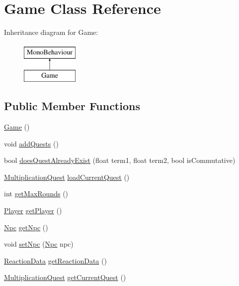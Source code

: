 \hypertarget{classGame}{}\section{Game Class Reference}
\label{classGame}
Inheritance diagram for Game\+:\begin{figure}[H]
\begin{center}
\leavevmode
\includegraphics[height=2.000000cm]{classGame}
\end{center}
\end{figure}
\subsection*{Public Member Functions}
\begin{DoxyCompactItemize}
\item 
\hyperlink{classGame_a2e034e53e9c032964ecd2a831b29a616}{Game} ()
\item 
void \hyperlink{classGame_ab082e0ceed285697693c3750e203d597}{add\+Quests} ()
\item 
bool \hyperlink{classGame_a0040f1dc86b0628a17286895b1738a10}{does\+Quest\+Already\+Exist} (float term1, float term2, bool is\+Commutative)
\item 
\hyperlink{classMultiplicationQuest}{Multiplication\+Quest} \hyperlink{classGame_a535c863103c355df501a523b378b19c4}{load\+Current\+Quest} ()
\item 
int \hyperlink{classGame_af4e27e50ead6b1204fded03ab13bc136}{get\+Max\+Rounds} ()
\item 
\hyperlink{classPlayer}{Player} \hyperlink{classGame_a9ed9805da9c46d237f0be3274ed37514}{get\+Player} ()
\item 
\hyperlink{classNpc}{Npc} \hyperlink{classGame_ac57921413d0a3222c8c514483ba74c3f}{get\+Npc} ()
\item 
void \hyperlink{classGame_a95b602074c7accf633342d64fc572784}{set\+Npc} (\hyperlink{classNpc}{Npc} npc)
\item 
\hyperlink{classReactionData}{Reaction\+Data} \hyperlink{classGame_ab42f098f8a14194c432bef59fc935e1d}{get\+Reaction\+Data} ()
\item 
\hyperlink{classMultiplicationQuest}{Multiplication\+Quest} \hyperlink{classGame_a4df0125f52073de2cdc4d048a3db792a}{get\+Current\+Quest} ()
\end{DoxyCompactItemize}


